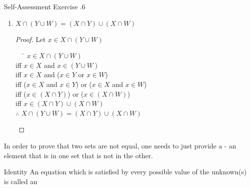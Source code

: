 \documentclass[../notes.tex]{subfiles}
\begin{document}
\begin{exercise}{Self-Assessment Exercise \thechapter.6}
\begin{multicols}{2}
\begin{enumerate}[label=(\alph*), itemsep=0.5em]
\begin{proof}
\begin{tabbing}
									iff \> $x \in (X \cap Y) \cap W$\\
									$\therefore$ \> $X \cap (Y \cap W) = (X \cap Y) \cap W$
								\end{tabbing}
							\end{proof}
						\item $X \cap (Y \cup W) = (X \cap Y) \cup (X \cap W)$
							\begin{proof}
								Let $x \in X \cap (Y \cup W)$
								\begin{tabbing}
									$\quad$ \= $x \in X \cap (Y \cup W)$\\
									iff \> $x \in X$ and $x \in (Y \cup W)$\\
									iff \> $x \in X$ and ($x \in Y$ or $x \in W$)\\
									iff \> ($x \in X$ and $x \in Y$) or ($x \in X$ and $x \in W$)\\
									iff \> ($x \in (X \cap Y)$) or ($x \in (X \cap W)$)\\
									iff \> $x \in (X \cap Y) \cup (X \cap W)$\\
									$\therefore$ \> $X \cap (Y \cup W) = (X \cap Y) \cup (X \cap W)$
								\end{tabbing}
							\end{proof}
					\end{enumerate}
				\end{multicols}
			\end{exercise}
			In order to prove that two sets are not equal, one needs to just provide a  - an element that is in one set that is not in the other.
			\begin{definition}{Identity}
				An equation which is satisfied by every possible value of the unknown(s) is called an 
			\end{definition}
		\pagebreak
\end{document}
